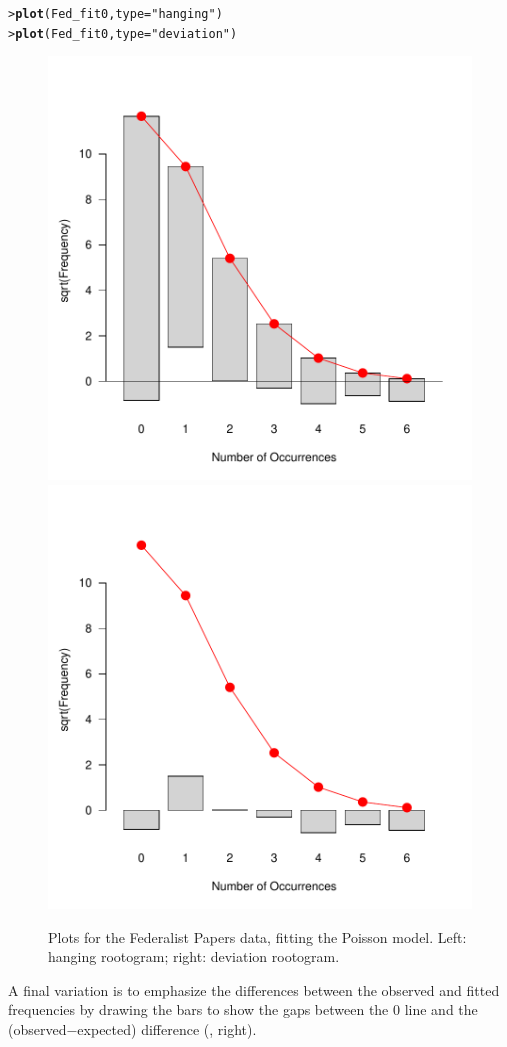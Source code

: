 \documentclass[10pt,krantz2]{krantz}\usepackage[]{graphicx}\usepackage[]{color}
\makeatletter
\newcommand{\hlstr}[1]{\textcolor[rgb]{0.192,0.494,0.8}{#1}}%
\newcommand{\hlstd}[1]{\textcolor[rgb]{0.345,0.345,0.345}{#1}}%
\newcommand{\hlkwc}[1]{\textcolor[rgb]{0.333,0.667,0.333}{#1}}%
\newcommand{\hlkwd}[1]{\textcolor[rgb]{0.737,0.353,0.396}{\textbf{#1}}}%
\newenvironment{kframe}{%
 \def\at@end@of@kframe{}%
 \ifinner\ifhmode%
  \def\at@end@of@kframe{\end{minipage}}%
  \begin{minipage}{\columnwidth}%
 \fi\fi%
 \def\FrameCommand##1{\hskip\@totalleftmargin \hskip-\fboxsep
 \colorbox{shadecolor}{##1}\hskip-\fboxsep
     \hskip-\linewidth \hskip-\@totalleftmargin \hskip\columnwidth}%
 \MakeFramed {\advance\hsize-\width
   \@totalleftmargin\z@ \linewidth\hsize
   \@setminipage}}%
 {\par\unskip\endMakeFramed%
 \at@end@of@kframe}
\newenvironment{knitrout}{}{} %
\renewenvironment{knitrout}{\small\renewcommand{\baselinestretch}{.85}}{} %
\makeatother
\begin{document}
\begin{knitrout}
\color{fgcolor}\begin{kframe}
\begin{alltt}
\hlstd{> }\hlkwd{plot}\hlstd{(Fed_fit0,} \hlkwc{type} \hlstd{=} \hlstr{"hanging"}\hlstd{)}
\hlstd{> }\hlkwd{plot}\hlstd{(Fed_fit0,} \hlkwc{type} \hlstd{=} \hlstr{"deviation"}\hlstd{)}
\end{alltt}
\end{kframe}\begin{figure}[!htbp]

\centerline{\includegraphics[width=.48\textwidth]{ch03/fig/Fed0-plots2-1} 
\includegraphics[width=.48\textwidth]{ch03/fig/Fed0-plots2-2} }

\caption[Plots for the Federalist Papers data, fitting the Poisson model]{Plots for the Federalist Papers data, fitting the Poisson model. Left: hanging rootogram; right: deviation rootogram.\label{fig:Fed0-plots2}}
\end{figure}


\end{knitrout}

A final variation is to emphasize the differences between the
observed and fitted frequencies by drawing the bars to show the
gaps between the 0 line and the (observed$-$expected) difference
(, right).
\end{document}
